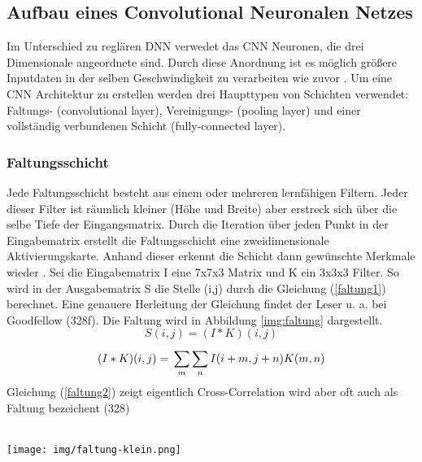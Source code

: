 \documentclass[twosided,a4,10pt]{article}
\begin{document}
\begin{multicols}{2}
\subsection{Aufbau eines Convolutional Neuronalen Netzes}
Im Unterschied zu reglären DNN verwedet das CNN Neuronen, die drei Dimensionale angeordnete sind. Durch diese Anordnung ist es möglich größere Inputdaten in der selben Geschwindigkeit zu verarbeiten wie zuvor \cite{karpathy}. Um eine CNN Architektur zu erstellen werden drei Haupttypen von Schichten verwendet: Faltungs- (convolutional layer), Vereinigungs- (pooling layer) und einer vollständig verbundenen Schicht (fully-connected layer).

\subsubsection*{Faltungsschicht}
Jede Faltungsschicht besteht aus einem oder mehreren lernfähigen Filtern. Jeder dieser Filter ist räumlich kleiner (Höhe und Breite) aber erstreck sich über die selbe Tiefe der Eingangsmatrix. Durch die Iteration über jeden Punkt in der Eingabematrix erstellt die Faltungsschicht eine zweidimensionale Aktivierungskarte. Anhand dieser erkennt die Schicht dann gewünschte Merkmale wieder \cite{karpathy}.\newline
Sei die Eingabematrix I eine 7x7x3 Matrix und K ein 3x3x3 Filter. So wird in der Ausgabematrix S die Stelle (i,j) durch die Gleichung (\ref{faltung1})  berechnet. Eine genauere Herleitung der Gleichung findet der Leser u. a. bei Goodfellow \cite{goodfellow}(328f). Die Faltung wird in Abbildung \ref{img:faltung} dargestellt.
\begin{equation}\label{faltung1}
S(i,j) =(I*K)(i,j)
\end{equation}
\begin{equation}\label{faltung2}
(I*K)(i,j) =\newline\sum_{m}^{}\sum_{n}^{}I(i+m,j+n)K(m,n)
\end{equation}
Gleichung (\ref{faltung2}) zeigt eigentlich Cross-Correlation wird aber oft auch als Faltung bezeichent \cite{goodfellow}(328)\\
\\
\begin{minipage}{0.45\textwidth}
	\centering
	\texttt{[image: img/faltung-klein.png]}
	\label{img:faltung}
\end{minipage}


\end{multicols}
\end{document}
